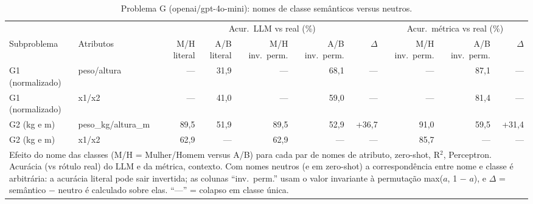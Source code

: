\begin{table}[htbp]
\centering
\footnotesize
\caption{Problema G (openai/gpt-4o-mini): nomes de classe semânticos versus neutros.}
\label{tab:bloco3_G_nomes_semanticos_vs_neutros_gpt4mini}
\begin{tabular}{llrrrrrrrr}
\toprule
 &  & \multicolumn{5}{c}{Acur.\ LLM vs real (\%)} & \multicolumn{3}{c}{Acur.\ métrica vs real (\%)} \\ \cmidrule(lr){3-7} \cmidrule(lr){8-10}
Subproblema & Atributos & M/H literal & A/B literal & M/H inv.\ perm. & A/B inv.\ perm. & $\Delta$ & M/H inv.\ perm. & A/B inv.\ perm. & $\Delta$ \\
\midrule
G1 (normalizado) & peso/altura & — & 31,9 & — & 68,1 & — & — & 87,1 & — \\
G1 (normalizado) & x1/x2 & — & 41,0 & — & 59,0 & — & — & 81,4 & — \\
\midrule
G2 (kg e m) & peso\_kg/altura\_m & 89,5 & 51,9 & 89,5 & 52,9 & +36,7 & 91,0 & 59,5 & +31,4 \\
G2 (kg e m) & x1/x2 & 62,9 & — & 62,9 & — & — & 85,7 & — & — \\
\bottomrule
\multicolumn{10}{p{0.95\linewidth}}{\footnotesize Efeito do nome das classes (M/H = Mulher/Homem versus A/B) para cada par de nomes de atributo, zero-shot, R$^2$, Perceptron. Acurácia (vs rótulo real) do LLM e da métrica, contexto. Com nomes neutros (e em zero-shot) a correspondência entre nome e classe é arbitrária: a acurácia literal pode sair invertida; as colunas ``inv.\ perm.'' usam o valor invariante à permutação max($a$, 1 $-$ $a$), e $\Delta$ = semântico $-$ neutro é calculado sobre elas. ``—'' = colapso em classe única.} \\
\end{tabular}
\end{table}
